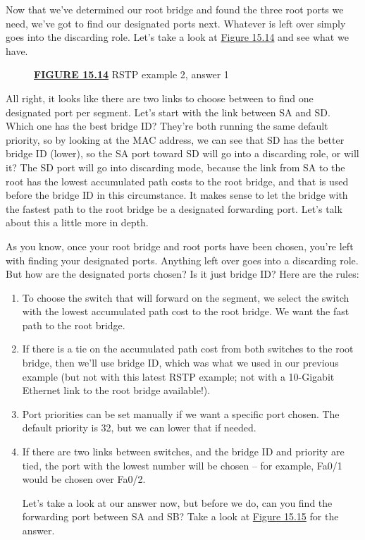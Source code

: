 \documentclass[b5paper,11pt]{memoir}
\begin{document}
Now that we've determined our root bridge and found the three root ports
we need, we've got to find our designated ports next. Whatever is left
over simply goes into the discarding role. Let's take a look at
\protect\hyperlink{c15.xhtmlux5cux23figure15-14}{Figure 15.14} and see
what we have.

\begin{figure}
\centering
\caption{{\protect\hyperlink{c15.xhtmlux5cux23figureanchor15-14}{\textbf{FIGURE
15.14}} RSTP example 2, answer 1}}
\end{figure}

All right, it looks like there are two links to choose between to find
one designated port per segment. Let's start with the link between SA
and SD. Which one has the best bridge
ID? They're both
running the same default priority, so by looking at the MAC address, we
can see that SD has the better bridge ID (lower), so the SA port toward
SD will go into a discarding role, or will it? The SD port will go into
discarding mode, because the link from SA to the root has the lowest
accumulated path costs to the root bridge, and that is used before the
bridge ID in this circumstance. It makes sense to let the bridge with
the fastest path to the root bridge be a designated forwarding port.
Let's talk about this a little more in depth.

As you know, once your root bridge and root ports have been chosen,
you're left with finding your designated ports. Anything left over goes
into a discarding role. But how are the designated ports chosen? Is it
just bridge ID? Here are the rules:

\begin{enumerate}
\item
  To choose the switch that will forward on the segment, we select the
  switch with the lowest accumulated path cost to the root bridge. We
  want the fast path to the root bridge.
\item
  If there is a tie on the accumulated path cost from both switches to
  the root bridge, then we'll use bridge ID, which was what we used in
  our previous example (but not with this latest RSTP example; not with
  a 10-Gigabit Ethernet link to the root bridge available!).
\item
  Port priorities can be set manually if we want a specific port chosen.
  The default priority is 32, but we can lower that if needed.
\item
  If there are two links between switches, and the bridge ID and
  priority are tied, the port with the lowest number will be
  chosen -- for example, Fa0/1 would be chosen over Fa0/2.

  Let's take a look at our answer now, but before we do, can you find
  the forwarding port between SA and SB? Take a look at
  \protect\hyperlink{c15.xhtmlux5cux23figure15-15}{Figure 15.15} for the
  answer.
\end{enumerate}
\end{document}
